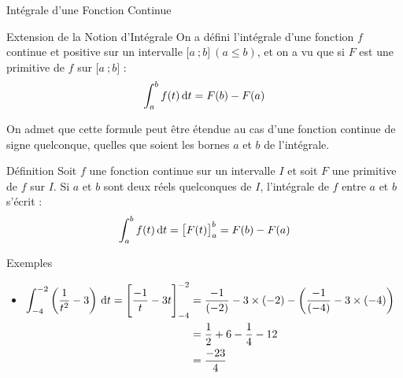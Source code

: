 \documentclass{coursbook}
\begin{document}
    \begin{Gpartie}{Intégrale d'une Fonction Continue} 
        \begin{Spartie}{Extension de la Notion d'Intégrale} 
            On a défini l'intégrale d'une fonction $f$ continue et positive sur un intervalle $\big[a~;b\big]~\left(a\leq b\right)$, et on a vu que si $F$ est une primitive de $f$ sur $\big[a~;b\big]$ : \[\int_a^b f(t)\,\mathrm{d}t=F(b)-F(a)\]

            On admet que cette formule peut être étendue au cas d'une fonction continue de signe quelconque, quelles que soient les bornes $a$ et $b$ de l'intégrale.

            \begin{SSpartie}{Définition} 
                Soit $f$ une fonction continue sur un intervalle $I$ et soit $F$ une primitive de $f$ sur $I$. Si $a$ et $b$ sont deux réels quelconques de $I$, l'intégrale de $f$ entre $a$ et $b$ s'écrit : \[\int_a^b f(t)\,\mathrm{d}t=\big[F(t)\big]_a^b=F(b)-F(a)\]
            \end{SSpartie}
            \begin{SSpartie}{Exemples} 
                \begin{itemize}
                    \item   
                    $\begin{aligned}[t]
                        \int_{-4}^{-2}\left(\frac{1}{t^2}-3\right)\dt=\Bigg[\frac{-1}{t}-3t\Bigg]_{-4}^{-2}&=\frac{-1}{(-2)}-3\times(-2)-\left(\frac{-1}{(-4)}-3\times(-4)\right)  \\
                        &=\frac{1}{2}+6-\frac{1}{4}-12 \\
                        &=\frac{-23}{4}
                    \end{aligned}$


\end{itemize}
\end{SSpartie}
\end{Spartie}
\end{Gpartie}
\end{document}
